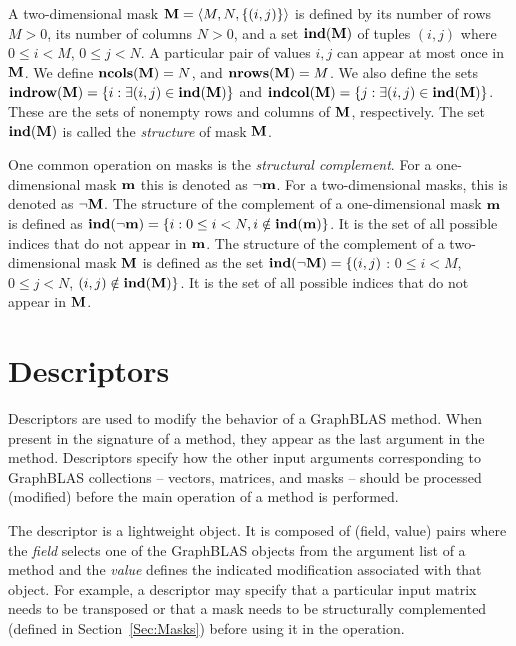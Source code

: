 A two-dimensional mask ${\bf M} = \langle M, N, \{ (i,j) \}
\rangle$ is defined by its number of rows $M>0$, its number of
columns $N>0$, and a set $\mathbf{ind}({\bf M})$ of tuples $(i,j)$
where $0 \leq i < M$, $0 \leq j < N$.   A particular pair of values
$i,j$ can appear at most once in ${\bf M}$.  We define
$\mathbf{ncols}({\bf M}) = N$, and $\mathbf{nrows}({\bf M}) = M$.
We also define the sets ${\bf indrow({\bf M})} = \{ i : \exists
(i,j) \in \mathbf{ind}({\bf M}) \}$ and ${\bf indcol({\bf M})}
= \{ j : \exists (i,j) \in \mathbf{ind}({\bf M}) \}$.  These are
the sets of nonempty rows and columns of ${\bf M}$, respectively.
The set $\mathbf{ind}({\bf M})$ is called the \emph{structure} of mask ${\bf M}$.

One common operation on masks is the \emph{structural complement}.
For a one-dimensional mask ${\bf m}$ this is denoted as
$\neg{\bf m}$. For a two-dimensional masks, this is denoted as
$\neg{\bf M}$.  The structure of the complement of a one-dimensional
mask ${\bf m}$ is defined as $\mathbf{ind}(\neg{\bf m}) = \{i : 0
\leq i < N, i \notin \mathbf{ind}({\bf m}) \}$.  It is the set of all
possible indices that do not appear in ${\bf m}$.  The structure
of the complement of a two-dimensional mask ${\bf M}$ is defined as the set
$\mathbf{ind}(\neg{\bf M}) = \{(i,j)$ : $0 \leq i < M$, $0 \leq j < N$,
$(i,j) \notin \mathbf{ind}({\bf M}) \}$.  It is the set of all possible
indices that do not appear in ${\bf M}$.

\section{Descriptors}
\label{Sec:Descriptors}

Descriptors are used to modify the behavior of a GraphBLAS method.
When present in the signature of a method, they appear as the last
argument in the method.  Descriptors specify how the other input arguments
corresponding to GraphBLAS collections -- vectors, matrices, and masks
-- should be processed (modified) before the main operation of a method
is performed.

The descriptor is a lightweight object.  It is composed of (field,
value) pairs where the \emph{field} selects one of the GraphBLAS objects
from the argument list of a method and the \emph{value} defines the
indicated modification associated with that object.  For example,
a descriptor may specify that a particular input matrix needs to be
transposed or that a mask needs to be structurally complemented (defined
in Section~\ref{Sec:Masks}) before using it in the operation.

